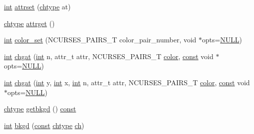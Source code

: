 \begin{DoxyCompactItemize}
\item 
\hyperlink{term__entry_8h_ad65b480f8c8270356b45a9890f6499ae}{int} \hyperlink{class_n_curses_window_aa2cde0b20edcae2bbdef7decc71d878e}{attrset} (\hyperlink{curses_8priv_8h_ad21482314c581139d01159829e841e51}{chtype} at)
\item 
\hyperlink{curses_8priv_8h_ad21482314c581139d01159829e841e51}{chtype} \hyperlink{class_n_curses_window_ab47d267fef2e7debbcab4033a649bd76}{attrget} ()
\item 
\hyperlink{term__entry_8h_ad65b480f8c8270356b45a9890f6499ae}{int} \hyperlink{class_n_curses_window_aabc53207870370ce60d876f43d875704}{color\-\_\-set} (N\-C\-U\-R\-S\-E\-S\-\_\-\-P\-A\-I\-R\-S\-\_\-\-T color\-\_\-pair\-\_\-number, void $\ast$opts=\hyperlink{internal_8h_a070d2ce7b6bb7e5c05602aa8c308d0c4}{N\-U\-L\-L})
\item 
\hyperlink{term__entry_8h_ad65b480f8c8270356b45a9890f6499ae}{int} \hyperlink{class_n_curses_window_a94f745c9a3b5b181574c6fb28a79af6e}{chgat} (\hyperlink{term__entry_8h_ad65b480f8c8270356b45a9890f6499ae}{int} n, attr\-\_\-t attr, N\-C\-U\-R\-S\-E\-S\-\_\-\-P\-A\-I\-R\-S\-\_\-\-T \hyperlink{_entity_8cpp_a864889304a90873adb9c6e289a54bcf4}{color}, \hyperlink{term__entry_8h_a57bd63ce7f9a353488880e3de6692d5a}{const} void $\ast$opts=\hyperlink{internal_8h_a070d2ce7b6bb7e5c05602aa8c308d0c4}{N\-U\-L\-L})
\item 
\hyperlink{term__entry_8h_ad65b480f8c8270356b45a9890f6499ae}{int} \hyperlink{class_n_curses_window_af8d308b081a9bdfd80964dbdc2f88ced}{chgat} (\hyperlink{term__entry_8h_ad65b480f8c8270356b45a9890f6499ae}{int} y, \hyperlink{term__entry_8h_ad65b480f8c8270356b45a9890f6499ae}{int} x, \hyperlink{term__entry_8h_ad65b480f8c8270356b45a9890f6499ae}{int} n, attr\-\_\-t attr, N\-C\-U\-R\-S\-E\-S\-\_\-\-P\-A\-I\-R\-S\-\_\-\-T \hyperlink{_entity_8cpp_a864889304a90873adb9c6e289a54bcf4}{color}, \hyperlink{term__entry_8h_a57bd63ce7f9a353488880e3de6692d5a}{const} void $\ast$opts=\hyperlink{internal_8h_a070d2ce7b6bb7e5c05602aa8c308d0c4}{N\-U\-L\-L})
\item 
\hyperlink{curses_8priv_8h_ad21482314c581139d01159829e841e51}{chtype} \hyperlink{class_n_curses_window_a58d850bb487960769820b2c8da82b8f5}{getbkgd} () \hyperlink{term__entry_8h_a57bd63ce7f9a353488880e3de6692d5a}{const} 
\item 
\hyperlink{term__entry_8h_ad65b480f8c8270356b45a9890f6499ae}{int} \hyperlink{class_n_curses_window_a1c799ccdafec1b5edec8ae548b91f7a4}{bkgd} (\hyperlink{term__entry_8h_a57bd63ce7f9a353488880e3de6692d5a}{const} \hyperlink{curses_8priv_8h_ad21482314c581139d01159829e841e51}{chtype} \hyperlink{curses_8priv_8h_a49725d2659c0161681c55e3763942f68}{ch})

\end{DoxyCompactItemize}
